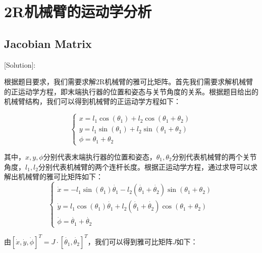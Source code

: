 \documentclass{ctexart}
\begin{document}



\newpage


\newpage
\pagestyle{fancy}
\fancyhf{}
\fancyfoot[C]{\thepage}
\section{2R机械臂的运动学分析}
\subsection{Jacobian Matrix}
[Solution]:\par

根据题目要求，我们需要求解2R机械臂的雅可比矩阵。首先我们需要求解机械臂的正运动学方程，即末端执行器的位置和姿态与关节角度的关系。根据题目给出的机械臂结构，我们可以得到机械臂的正运动学方程如下：

\begin{equation}
	\left \{\begin{array}{c}
		x = l_1 \cos(\theta_1) + l_2 \cos(\theta_1 + \theta_2) \\
		y = l_1 \sin(\theta_1) + l_2 \sin(\theta_1 + \theta_2) \\
		\phi = \theta_1 + \theta_2		
	\end{array} \right.
\end{equation}

其中，$x, y, \phi$分别代表末端执行器的位置和姿态，$\theta_1, \theta_2$分别代表机械臂的两个关节角度，$l_1, l_2$分别代表机械臂的两个连杆长度。根据正运动学方程，通过求导可以求解出机械臂的雅可比矩阵如下：
\begin{equation}
	\left\{\begin{array}{c}
		\dot{x} = -l_1 \sin(\theta_1) \dot{\theta_1} - l_2 (\dot{\theta_1} + \dot{\theta_2}) \sin(\theta_1 + \theta_2)  \\
		\dot{y} = l_1 \cos(\theta_1) \dot{\theta_1} + l_2  (\dot{\theta_1} + \dot{\theta_2}) \cos(\theta_1 + \theta_2)  \\
		\dot{\phi} = \dot{\theta_1} + \dot{\theta_2}
	\end{array}\right.
\end{equation}

由$[\dot{x}, \dot{y}, \dot{\phi}]^T = J \cdot [\dot{\theta_1}, \dot{\theta_2}]^T$，我们可以得到雅可比矩阵$J$如下：
\end{document}

